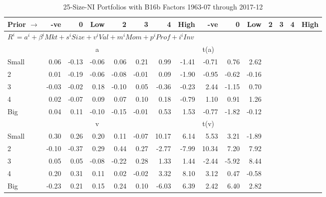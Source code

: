
\begin{table}[!ht]
\footnotesize
\centering
\caption{25-Size-NI Portfolios with B16b Factors 1963-07 through 2017-12}
\begin{tabular}{lrrrrrrrrrrrrrr}
  \toprule
    Prior $\rightarrow$ & -ve & 0 & Low & 2 & 3 & 4 & High & -ve & 0 & Low & 2 & 3 & 4 & High \\ 
  \midrule
  \multicolumn{11}{l}{$R^i=a^i+\beta^iMkt+s^iSize+v^iVal+m^iMom+p^iProf+i^iInv$} \\

  
    
      & \multicolumn{5}{c}{a} & \multicolumn{5}{c}{t(a)}
    
    \\
      \cmidrule(r){2-6} \cmidrule(r){7-11}

    Small   & 0.06  & -0.13  & -0.06  & 0.06  & 0.21  & 0.99  & -1.41  & -0.71  & 0.76  & 2.62  \\
         2  & 0.01  & -0.19  & -0.06  & -0.08  & -0.01  & 0.09  & -1.90  & -0.95  & -0.62  & -0.16  \\
         3  & -0.03  & -0.02  & 0.18  & -0.10  & 0.05  & -0.36  & -0.23  & 2.44  & -1.15  & 0.70  \\
         4  & 0.02  & -0.07  & 0.09  & 0.07  & 0.10  & 0.18  & -0.79  & 1.10  & 0.91  & 1.26  \\
    Big     & 0.04  & 0.11  & -0.10  & -0.15  & -0.01  & 0.53  & 1.53  & -0.77  & -1.82  & -0.12  \\

  
    
      & \multicolumn{5}{c}{v} & \multicolumn{5}{c}{t(v)}
    
    \\
      \cmidrule(r){2-6} \cmidrule(r){7-11}

    Small   & 0.30  & 0.26  & 0.20  & 0.11  & -0.07  & 10.17  & 6.14  & 5.53  & 3.21  & -1.89  \\
         2  & -0.10  & -0.37  & 0.29  & 0.44  & 0.27  & -2.77  & -7.99  & 10.34  & 7.20  & 7.92  \\
         3  & 0.05  & 0.05  & -0.08  & -0.22  & 0.28  & 1.33  & 1.44  & -2.44  & -5.92  & 8.44  \\
         4  & 0.20  & 0.31  & 0.11  & 0.02  & -0.02  & 3.32  & 8.10  & 3.12  & 0.47  & -0.58  \\
    Big     & -0.23  & 0.21  & 0.15  & 0.24  & 0.10  & -6.03  & 6.39  & 2.42  & 6.40  & 2.82  \\

  
    

\end{tabular}
\end{table}
